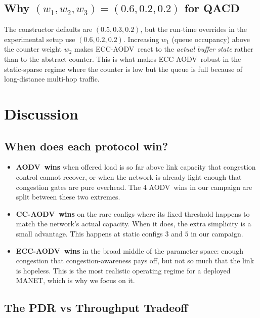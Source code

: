\documentclass[11pt,a4paper]{article}
\newcommand{\ecc}{ECC-AODV}
\newcommand{\cca}{CC-AODV}
\newcommand{\aodv}{AODV}
\begin{document}
\subsection{Why $(w_1,w_2,w_3) = (0.6,0.2,0.2)$ for QACD}

The constructor defaults are $(0.5,0.3,0.2)$, but the run-time overrides in
the experimental setup use $(0.6,0.2,0.2)$. Increasing $w_1$ (queue
occupancy) above the counter weight $w_2$ makes \ecc\ react to the
\emph{actual buffer state} rather than to the abstract counter. This is what
makes \ecc\ robust in the static-sparse regime where the counter is low but
the queue is full because of long-distance multi-hop traffic.

\section{Discussion}
\label{sec:discussion}

\subsection{When does each protocol win?}

\begin{itemize}
    \item \textbf{\aodv\ wins} when offered load is so far above link capacity
          that congestion control cannot recover, or when the network is
          already light enough that congestion gates are pure overhead. The
          $4$ \aodv\ wins in our campaign are split between these two extremes.
    \item \textbf{\cca\ wins} on the rare configs where its fixed threshold
          happens to match the network's actual capacity. When it does, the
          extra simplicity is a small advantage. This happens at static
          configs $3$ and $5$ in our campaign.
    \item \textbf{\ecc\ wins} in the broad middle of the parameter space:
          enough congestion that congestion-awareness pays off, but not so
          much that the link is hopeless. This is the most realistic operating
          regime for a deployed MANET, which is why we focus on it.
\end{itemize}

\subsection{The PDR vs Throughput Tradeoff}
\end{document}
